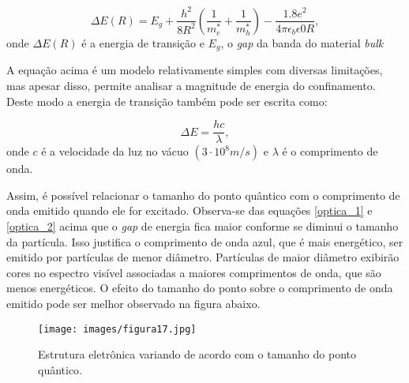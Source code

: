 \begin{equation}
	\label{optica_1}
	\Delta E(R) = E_{g} + \frac{h^2}{8R^2} \left(\frac{1}{m^{\ast}_{e}} + \frac{1}{m^{\ast}_{h}} \right) - \frac{1.8e^2}{4\pi \epsilon_{b} \epsilon{0}R},
\end{equation}
onde $\Delta E(R)$ é a energia de transição e $E_{g}$, o \textit{gap} da banda do material \textit{bulk}

A equação acima é um modelo relativamente simples com diversas limitações, mas apesar disso, permite analisar a magnitude de energia do confinamento\cite{optica2}\cite{bulk2}. Deste modo a energia de transição também pode ser escrita como:

\begin{equation}
	\label{optica_2}
	\Delta E = \frac{hc}{\lambda},
\end{equation}
onde $c$ é a velocidade da luz no vácuo $(3\cdot 10^8 m/s)$ e $\lambda$ é o comprimento de onda.

Assim, é possível relacionar o tamanho do ponto quântico com o comprimento de onda emitido quando ele for excitado. Observa-se das equações \eqref{optica_1} e \eqref{optica_2} acima  que  o \textit{gap} de energia fica maior conforme se diminui o tamanho da partícula. Isso justifica o comprimento de onda azul, que é mais energético, ser emitido por partículas de menor diâmetro. Partículas de maior diâmetro exibirão cores no espectro visível associadas a maiores comprimentos de onda, que são menos energéticos. O efeito do tamanho do ponto sobre o comprimento de onda emitido pode ser melhor observado na figura abaixo. 

\begin{figure}[H]
  \centering
  \caption{Estrutura eletrônica variando de acordo com o tamanho do ponto quântico\cite{optica1}.}
  \texttt{[image: images/figura17.jpg]}
  \label{fig17}
\end{figure}